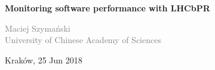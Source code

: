 
{ %

{
\begin{frame}[c]%
\begin{center}
\Large{\textbf{}\textbf{Monitoring software performance with LHCbPR}
}

\quad


\vspace{1em}
\footnotesize\textcolor{gray}{Maciej Szyma\'nski \\University of Chinese Academy of Sciences
\texttt{%
}}
\vspace{.5em}


\footnotesize\textcolor{normal text.fg!50!Comment}{{} Krak\'ow, 25 Jun 2018}
\end{center}


\end{frame}
}

}
